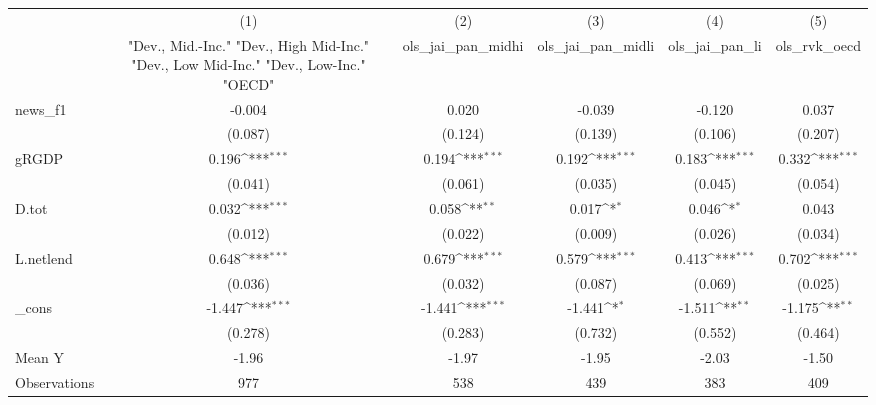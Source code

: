 {
\def\sym#1{\ifmmode^{#1}\else\(^{#1}\)\fi}
\begin{tabular}{l*{5}{c}}
\toprule
            &\multicolumn{1}{c}{(1)}&\multicolumn{1}{c}{(2)}&\multicolumn{1}{c}{(3)}&\multicolumn{1}{c}{(4)}&\multicolumn{1}{c}{(5)}\\
            &\multicolumn{1}{c}{ "Dev., Mid.-Inc." "Dev., High Mid-Inc." "Dev., Low Mid-Inc." "Dev., Low-Inc." "OECD" }&\multicolumn{1}{c}{ols\_jai\_pan\_midhi}&\multicolumn{1}{c}{ols\_jai\_pan\_midli}&\multicolumn{1}{c}{ols\_jai\_pan\_li}&\multicolumn{1}{c}{ols\_rvk\_oecd}\\
\midrule
news\_f1     &      -0.004         &       0.020         &      -0.039         &      -0.120         &       0.037         \\
            &     (0.087)         &     (0.124)         &     (0.139)         &     (0.106)         &     (0.207)         \\
\addlinespace
gRGDP       &       0.196\sym{***}&       0.194\sym{***}&       0.192\sym{***}&       0.183\sym{***}&       0.332\sym{***}\\
            &     (0.041)         &     (0.061)         &     (0.035)         &     (0.045)         &     (0.054)         \\
\addlinespace
D.tot       &       0.032\sym{***}&       0.058\sym{**} &       0.017\sym{*}  &       0.046\sym{*}  &       0.043         \\
            &     (0.012)         &     (0.022)         &     (0.009)         &     (0.026)         &     (0.034)         \\
\addlinespace
L.netlend   &       0.648\sym{***}&       0.679\sym{***}&       0.579\sym{***}&       0.413\sym{***}&       0.702\sym{***}\\
            &     (0.036)         &     (0.032)         &     (0.087)         &     (0.069)         &     (0.025)         \\
\addlinespace
\_cons      &      -1.447\sym{***}&      -1.441\sym{***}&      -1.441\sym{*}  &      -1.511\sym{**} &      -1.175\sym{**} \\
            &     (0.278)         &     (0.283)         &     (0.732)         &     (0.552)         &     (0.464)         \\
\midrule
Mean Y      &       -1.96         &       -1.97         &       -1.95         &       -2.03         &       -1.50         \\
Observations&         977         &         538         &         439         &         383         &         409         \\
\bottomrule
\end{tabular}
}
